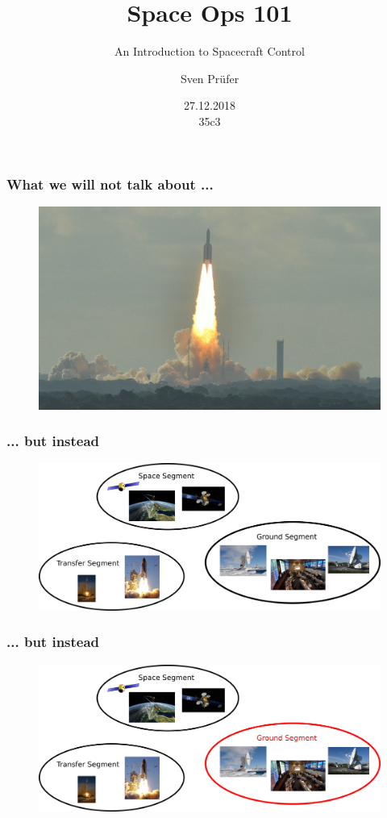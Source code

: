 \documentclass[12pt,utf8,notheorems,compress]{beamer}
\title{Space Ops 101}
\subtitle{An Introduction to Spacecraft Control}
\author{Sven Prüfer}
\institute{German Space Operations Center}
\date{27.12.2018\\[0.5cm]
35c3}
\begin{document}
\begin{frame}
 \titlepage
\end{frame}

\begin{frame}
  \frametitle{What we will not talk about ...}
  \begin{figure}[!ht]
    \centering
    \includegraphics[width=\textwidth]{rocket-launch.jpg}
  \end{figure}
\end{frame}

\begin{frame}
  \frametitle{... but instead}
    \begin{figure}[!ht]
    \centering
    \includegraphics[width=\textwidth]{segments.png}
  \end{figure}
\end{frame}

\begin{frame}
  \frametitle{... but instead}
  \begin{figure}[!ht]
    \centering
    \includegraphics[width=\textwidth]{segments-red.png}
  \end{figure}
\end{frame}
\end{document}
